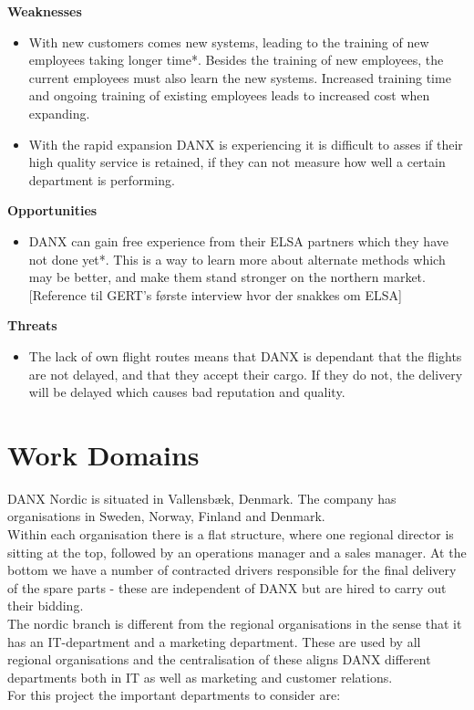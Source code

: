 \textbf{Weaknesses}
\begin{itemize}
\item With new customers comes new systems, leading to the training of new employees taking longer time*. Besides the training of new employees, the current employees must also learn the new systems. Increased training time and ongoing training of existing employees leads to increased cost when expanding.
\item With the rapid expansion DANX is experiencing it is difficult to asses if their high quality service is retained, if they can not measure how well a certain department is performing.
\end{itemize}

\textbf{Opportunities}
\begin{itemize}
\item DANX can gain free experience from their ELSA partners which they have not done yet*. This is a way to learn more about alternate methods which may be better, and make them stand stronger on the northern market. [Reference til GERT’s første interview hvor der snakkes om ELSA]
\end{itemize}

\textbf{Threats}
\begin{itemize}
\item The lack of own flight routes means that DANX is dependant that the flights are not delayed, and that they accept their cargo. If they do not, the delivery will be delayed which causes bad reputation and quality.
\end{itemize}

\section{Work Domains}
DANX Nordic is situated in Vallensbæk, Denmark. The company has organisations in Sweden, Norway, Finland and Denmark.\\
Within each organisation there is a flat structure, where one regional director is sitting at the top, followed by an operations manager and a sales manager. At the bottom we have a number of contracted drivers responsible for the final delivery of the spare parts - these are independent of DANX but are hired to carry out their bidding.\\
The nordic branch is different from the regional organisations in the sense that it has an IT-department and a marketing department. These are used by all regional organisations and the centralisation of these aligns DANX different departments both in IT as well as marketing and customer relations.\\
For this project the important departments to consider are:

